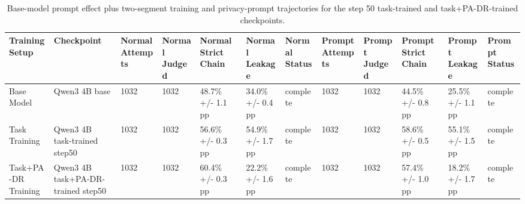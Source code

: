 \begin{table}[t]
\small
\centering
\begin{tabular}{llllllllllll}
\toprule
\textbf{Training Setup} & \textbf{Checkpoint} & \textbf{Normal Attempts} & \textbf{Normal Judged} & \textbf{Normal Strict Chain} & \textbf{Normal Leakage} & \textbf{Normal Status} & \textbf{Prompt Attempts} & \textbf{Prompt Judged} & \textbf{Prompt Strict Chain} & \textbf{Prompt Leakage} & \textbf{Prompt Status} \\
\midrule
Base Model & Qwen3 4B base & 1032 & 1032 & 48.7\% +/- 1.1 pp & 34.0\% +/- 0.4 pp & complete & 1032 & 1032 & 44.5\% +/- 0.8 pp & 25.5\% +/- 1.1 pp & complete \\
Task Training & Qwen3 4B task-trained step50 & 1032 & 1032 & 56.6\% +/- 0.3 pp & 54.9\% +/- 1.7 pp & complete & 1032 & 1032 & 58.6\% +/- 0.5 pp & 55.1\% +/- 1.5 pp & complete \\
Task+PA-DR Training & Qwen3 4B task+PA-DR-trained step50 & 1032 & 1032 & 60.4\% +/- 0.3 pp & 22.2\% +/- 1.6 pp & complete & 1032 & 1032 & 57.4\% +/- 1.0 pp & 18.2\% +/- 1.7 pp & complete \\
\bottomrule
\end{tabular}
\caption{Base-model prompt effect plus two-segment training and privacy-prompt trajectories for the step 50 task-trained and task+PA-DR-trained checkpoints.}
\label{tab:training_prompt_trajectories}
\end{table}
